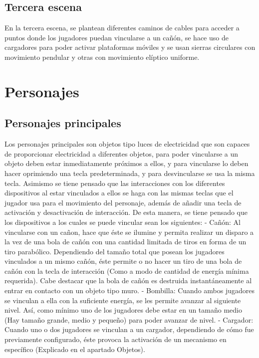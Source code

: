 \documentclass{article}
\begin{document}
\subsection{Tercera escena}
En la tercera escena, se plantean diferentes caminos de cables para acceder a puntos donde los jugadores puedan vincularse a un cañón, se hace uso de cargadores para poder activar plataformas móviles y se usan sierras circulares con movimiento pendular y otras con movimiento elíptico uniforme.
\section{Personajes}
\subsection{Personajes principales}
Los personajes principales son objetos tipo luces de electricidad que son capaces de proporcionar electricidad a diferentes objetos, para poder vincularse a un objeto deben estar inmediatamente próximos a ellos, y para vincularse lo deben hacer oprimiendo una tecla predeterminada, y para desvincularse se usa la misma tecla. Asimismo se tiene pensado que las interacciones con los diferentes dispositivos al estar vinculados a ellos se haga con las mismas teclas que el jugador usa para el movimiento del personaje, además de añadir una tecla de activación y desactivación de interacción. De esta manera, se tiene pensado que los dispositivos a los cuales se puede vincular sean los siguientes:
    - Cañón: Al vincularse con un cañon, hace que éste se ilumine y permita realizar un disparo a la vez de una bola de cañón con una cantidad limitada de tiros en forma de un tiro parabólico. Dependiendo del tamaño total que posean los jugadores vinculados a un mismo cañón, éste permite o no hacer un tiro de una bola de cañón con la tecla de interacción (Como a modo de cantidad de energía mínima requerida). Cabe destacar que la bola de cañón es destruida instantáneamente al entrar en contacto con un objeto tipo muro.
    - Bombilla: Cuando ambos jugadores se vinculan a ella con la suficiente energía, se les permite avanzar al siguiente nivel. Así, como mínimo uno de los jugadores debe estar en un tamaño medio (Hay tamaño grande, medio y pequeño) para poder avanzar de nivel.
    - Cargador: Cuando uno o dos jugadores se vinculan a un cargador, dependiendo de cómo fue previamente configurado, éste provoca la activación de un mecanismo en específico (Explicado en el apartado Objetos).
\end{document}
